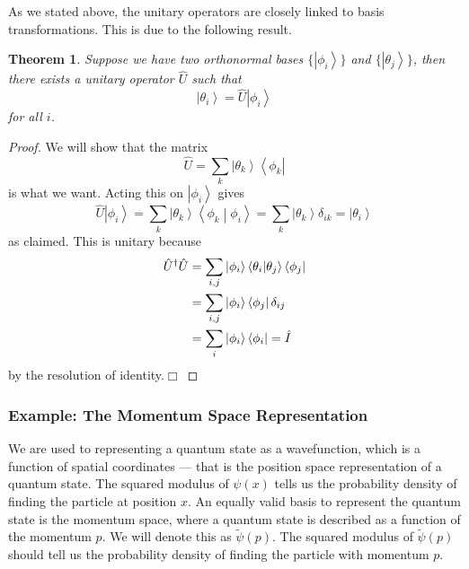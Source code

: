 \documentclass{article}
\theoremstyle{plain}\theoremheaderfont{\normalfont\itshape}\theorembodyfont{\rmfamily}\theoremseparator{.}\newtheorem*{rem}{Remark}\newtheorem*{ex}{Example}\newtheorem*{proof}{Proof}\newtheorem*{altp}{Alternative proof}
\theoremstyle{plain}\theoremheaderfont{\normalfont\bfseries}\theorembodyfont{\rmfamily}\theoremseparator{.}\newtheorem{thm}{Theorem}[section]\newtheorem{lem}[thm]{Lemma}\newtheorem{prop}[thm]{Proposition}\newtheorem*{cor}{Corollary}\newtheorem{defn}[thm]{Definition}\newtheorem{clm}[thm]{Claim}\newtheorem{clminproof}{Claim}
\theoremstyle{break}\theoremheaderfont{\normalfont\itshape}\theorembodyfont{\rmfamily}\theoremseparator{.\medskip}\newtheorem*{proofskip}{Proof}\newtheorem*{exs}{Examples}\newtheorem*{rems}{Remarks}
\theoremstyle{break}\theoremheaderfont{\normalfont\bfseries}\theorembodyfont{\rmfamily}\theoremseparator{.\medskip}\newtheorem{lemskip}[thm]{Lemma}\newtheorem{defnskip}[thm]{Definition}\newtheorem{propskip}[thm]{Proposition}\newtheorem{thmskip}[thm]{Theorem}
\numberwithin{equation}{section}
\newcommand{\qed}{\hfill\ensuremath{\Box}}
\newcommand{\bra}[1]{\left\langle #1 \right|}
\newcommand{\ket}[1]{\left| #1 \right\rangle}
\newcommand{\braket}[2]{\left\langle #1 \middle| #2 \right\rangle}
\begin{document}
    As we stated above, the unitary operators are closely linked to basis transformations. This is due to the following result.
    \begin{thm}\label{basis_transformation}
        Suppose we have two orthonormal bases \(\{\ket{\phi_i}\}\) and \(\{\ket{\theta_j}\}\), then there exists a unitary operator \(\hat{U}\) such that
        \begin{equation}
            \ket{\theta_i}=\hat{U}\ket{\phi_i}
        \end{equation}
        for all \(i\).
    \end{thm}
    \begin{proof}
        We will show that the matrix
        \begin{equation}\label{basis_transformtaion_matrix}
            \hat{U}=\sum_{k} \ket{\theta_k}\bra{\phi_k}
        \end{equation}
        is what we want. Acting this on \(\ket{\phi_i}\) gives
        \begin{equation}
            \hat{U}\ket{\phi_i}=\sum_{k}\ket{\theta_k}\braket{\phi_k}{\phi_i}=\sum_k \ket{\theta_k}\delta_{ik}=\ket{\theta_i}
        \end{equation}
        as claimed. This is unitary because
        \begin{align}
            \hat{U}^\dagger \hat{U}&=\sum_{i,j}\ket{\phi_i}\braket{\theta_i}{\theta_j}\bra{\phi_j}\notag\\
            &=\sum_{i,j}\ket{\phi_i}\bra{\phi_j}\delta_{ij}\notag \\
            &=\sum_i \ket{\phi_i}\bra{\phi_i}=\hat{I}
        \end{align}
        by the resolution of identity.\qed
    \end{proof}

    \subsubsection{Example: The Momentum Space Representation}
    We are used to representing a quantum state as a wavefunction, which is a function of spatial coordinates --- that is the position space representation of a quantum state. The squared modulus of \(\psi(x)\) tells us the probability density of finding the particle at position \(x\). An equally valid basis to represent the quantum state is the momentum space, where a quantum state is described as a function of the momentum \(p\). We will denote this as \(\tilde{\psi}(p)\). The squared modulus of \(\tilde{\psi}(p)\) should tell us the probability density of finding the particle with momentum \(p\).
\end{document}

